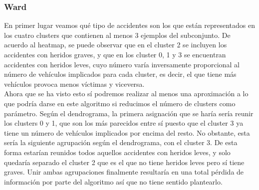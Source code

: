 	\subsubsection{Ward}
	
	En primer lugar veamos qué tipo de accidentes son los que están representados en los cuatro clusters que contienen al menos 3 ejemplos del subconjunto. De acuerdo al heatmap, se puede observar que en el cluster 2 se incluyen los accidentes con heridos graves, y que en los cluster 0, 1 y 3 se encuentran accidentes con heridos leves, cuyo número varía inversamente proporcional al número de vehículos implicados para cada cluster, es decir, el que tiene más vehículos provoca menos víctimas y viceversa.\\
	
	Ahora que se ha visto esto sí podremos realizar al menos una aproximación a lo que podría darse en este algoritmo si reducimos el número de clusters como parámetro. Según el dendrograma, la primera asignación que se haría sería reunir los clusters 0 y 1, que son  los más parecidos entre sí puesto que el cluster 3 ya tiene un número de vehículos implicados por encima del resto. No obstante, esta sería la siguiente agrupación según el dendrograma, con el cluster 3. De esta forma estarían reunidos todos aquellos accidentes con heridos leves, y solo quedaría separado el cluster 2 que es el que no tiene heridos leves pero sí tiene graves. Unir ambas agrupaciones finalmente resultaría en una total pérdida de información por parte del algoritmo así que no tiene sentido plantearlo.\\
	
